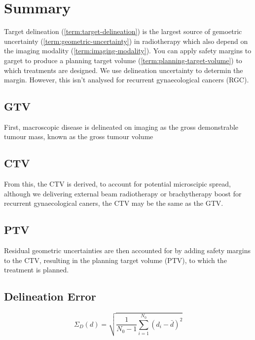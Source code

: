 \documentclass[11pt]{article}
\begin{document}


\tableofcontents

\clearpage

\section{Summary}

Target delineation (\ref{term:target-delineation}) is the largest source of gemoetric uncertainty (\ref{term:geometric-uncertainty}) in radiotherapy which also depend on the imaging modality (\ref{term:imaging-modality}). You can apply safety margins to garget to produce a planning target volume (\ref{term:planning-target-volume}) to which treatments are designed. We use delineation uncertainty to determin the margin. However, this isn't analysed for recurrent gynaecological cancers (RGC).

\subsection{GTV}

First, macroscopic disease is delineated on imaging as the gross demonstrable tumour mass, known as the gross tumour volume

\subsection{CTV}

From this, the CTV is derived, to account for potential microscipic spread, although we delivering external beam radiotherapy or brachytherapy boost for recurrent gynaecological caners, the CTV may be the same as the GTV.

\subsection{PTV}

Residual geometric uncertainties are then accounted for by
adding safety margins to the CTV, resulting in the planning
target volume (PTV), to which the treatment is planned.

\subsection{Delineation Error}

\begin{equation}
    \Sigma_D(d) = \sqrt{\frac{1}{N_0-1}\sum^{N_0}_{i=1}{(d_i - \bar d)^2}}\label{equ:delineation-error}
\end{equation}
\end{document}
